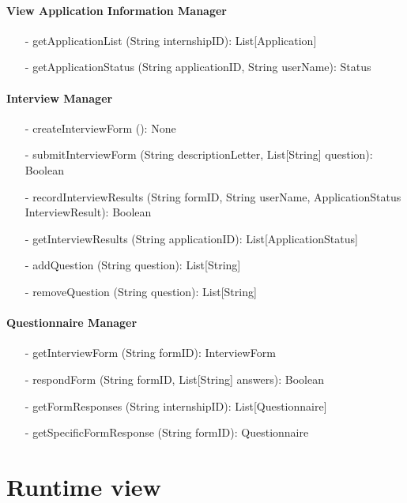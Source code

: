 \paragraph{View Application Information Manager}
\begin{itemize}
    \item[-] getApplicationList (String internshipID): List[Application]
    \item[-] getApplicationStatus (String applicationID, String userName): Status
\end{itemize}

\paragraph{Interview Manager}
\begin{itemize}
    \item[-] createInterviewForm (): None
    \item[-] submitInterviewForm (String descriptionLetter, List[String] question): Boolean
    \item[-] recordInterviewResults (String formID, String userName, ApplicationStatus InterviewResult): Boolean
    \item[-] getInterviewResults (String applicationID): List[ApplicationStatus]
    \item[-] addQuestion (String question): List[String]
    \item[-] removeQuestion (String question): List[String]
\end{itemize}

\paragraph{Questionnaire Manager}
\begin{itemize}
    \item[-] getInterviewForm (String formID): InterviewForm
    \item[-] respondForm (String formID, List[String] answers): Boolean
    \item[-] getFormResponses (String internshipID): List[Questionnaire]
    \item[-] getSpecificFormResponse (String formID): Questionnaire
\end{itemize}

\section{Runtime view}\label{sec:runtime view}


